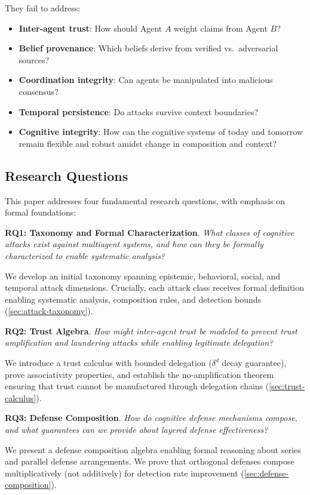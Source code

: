 \documentclass[
]{article}
\begin{document}
They fail to address:

\begin{itemize}
\item \textbf{Inter-agent trust}: How should Agent $A$ weight claims from Agent $B$?
\item \textbf{Belief provenance}: Which beliefs derive from verified vs.\ adversarial sources?
\item \textbf{Coordination integrity}: Can agents be manipulated into malicious consensus?
\item \textbf{Temporal persistence}: Do attacks survive context boundaries?
\item \textbf{Cognitive integrity}: How can the cognitive systems of today and tomorrow remain flexible and robust amidst change in composition and context?
\end{itemize}

\subsection{Research Questions}\label{sec:research-questions}

This paper addresses four fundamental research questions, with emphasis
on formal foundations:

\textbf{RQ1: Taxonomy and Formal Characterization}.
\textit{What classes of cognitive attacks exist against multiagent systems, and how can they be formally characterized to enable systematic analysis?}

We develop an initial taxonomy spanning epistemic, behavioral, social,
and temporal attack dimensions. Crucially, each attack class receives
formal definition enabling systematic analysis, composition rules, and
detection bounds (\cref{sec:attack-taxonomy}).

\textbf{RQ2: Trust Algebra}.
\textit{How might inter-agent trust be modeled to prevent trust amplification and laundering attacks while enabling legitimate delegation?}

We introduce a trust calculus with bounded delegation (\(\delta^d\)
decay guarantee), prove associativity properties, and establish the
no-amplification theorem ensuring that trust cannot be manufactured
through delegation chains (\cref{sec:trust-calculus}).

\textbf{RQ3: Defense Composition}.
\textit{How do cognitive defense mechanisms compose, and what guarantees can we provide about layered defense effectiveness?}

We present a defense composition algebra enabling formal reasoning about
series and parallel defense arrangements. We prove that orthogonal
defenses compose multiplicatively (not additively) for detection rate
improvement (\cref{sec:defense-composition}).
\end{document}
